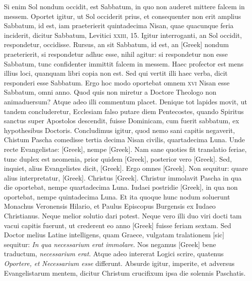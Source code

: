 Si enim Sol nondum occidit, est Sabbatum,
in quo non auderet mittere falcem in messem.
Oportet igitur,
ut Sol occiderit prius, et consequenter non erit amplius Sabbatum,
id est, iam praeterierit quintadecima Nisan, quae quacunque feria
inciderit, dicitur Sabbatum, Levitici \textsc{xxiii}, 15.
Igitur interroganti,
an Sol occidit, respondetur, occidisse.
Rursus, an sit Sabbatum, id
est, an \textgreek{[Greek]} nondum praeterierit, si respondetur adhuc
esse, nihil agitur: si respondetur non esse Sabbatum, tunc confidenter
immittit falcem in messem.
Haec profector est mens illius loci,
quanquam libri copia non est.
Sed qui vertit illi haec verba, dicit responderi
esse Sabbatum.
Ergo hoc modo oportebat omnem \textsc{xvi}
Nisan esse Sabbatum, omni anno.
Quod quis non miretur a Doctore
Theologo non animaduersum?
Atque adeo illi commentum
placet.
Denique tot lapides movit, ut tandem concluderetur, Ecclesiam
falso putare diem Pentecostes, quando Spiritus sanctus super
Apostolos descendit, fuisse Dominicam, cum fuerit sabbatum, ex
hypothesibus Doctoris.
Concludimus igitur, quod nemo sani capitis
negaverit, Chistum Pascha comedisse tertia decima Nisan civilis,
quartadecima Luna.
Unde recte Evangelistae: \textgreek{[Greek]},
nempe \textgreek{[Greek]}.
Nam sane quoties fit translatio feriae,
tunc duplex est neomenia, prior quidem \textgreek{[Greek]}, posterior vero
\textgreek{[Greek]}.
Sed, inquiet, alius Evangelistes dicit, \textgreek{[Greek]}.
Ergo omnes \textgreek{[Greek]}.
Non sequitur: quare alius interpretatur, \textgreek{[Greek]}.
Christus \textgreek{[Greek]}.
Christur immolavit Pascha in qua die
oportebat, nempe quartadecima Luna.
Iudaei postridie \textgreek{[Greek]},
in qua non oportebat, nempe quintadecima Luna.
Et ita quoque
hunc nodum soluerunt Monachus Veronensis Hilario, et Paulus
Episcopus Burgensis ex Iudaeo Christianus.
Neque melior solutio
dari potest.
Neque vero illi duo viri docti tam vacui capitis fuerunt,
ut crederent eo anno \textgreek{[Greek]} fuisse feriam sextam.
Sed Doctor melius Latine intelligens, quam Graece,
 vulgatam tralationem [sic]
sequitur: \textit{In qua necessarium erat immolare}.
Nos negamus
\textgreek{[Greek]} bene traductum, \textit{necessarium erat}.
Atque adeo intererat Logici
scrire, quatenus \textit{Oportere, et Necessarium esse} differunt.
Absurde igitur, imperite, et adversus Evangelistarum mentem, dicitur
Christum crucifixum ipsa die solennis Paschatis.
